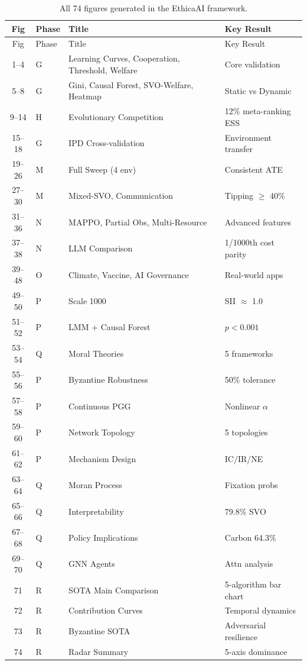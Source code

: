 \documentclass{article}
\begin{document}
\begin{longtable}{clll}
\caption{All 74 figures generated in the EthicaAI framework.} \\
\toprule
Fig & Phase & Title & Key Result \\
\midrule
\endfirsthead
\toprule
Fig & Phase & Title & Key Result \\
\midrule
\endhead
1--4 & G & Learning Curves, Cooperation, Threshold, Welfare & Core validation \\
5--8 & G & Gini, Causal Forest, SVO-Welfare, Heatmap & Static vs Dynamic \\
9--14 & H & Evolutionary Competition & 12\% meta-ranking ESS \\
15--18 & G & IPD Cross-validation & Environment transfer \\
19--26 & M & Full Sweep (4 env) & Consistent ATE \\
27--30 & M & Mixed-SVO, Communication & Tipping $\geq$ 40\% \\
31--36 & N & MAPPO, Partial Obs, Multi-Resource & Advanced features \\
37--38 & N & LLM Comparison & 1/1000th cost parity \\
39--48 & O & Climate, Vaccine, AI Governance & Real-world apps \\
49--50 & P & Scale 1000 & SII $\approx$ 1.0 \\
51--52 & P & LMM + Causal Forest & $p < 0.001$ \\
53--54 & Q & Moral Theories & 5 frameworks \\
55--56 & P & Byzantine Robustness & 50\% tolerance \\
57--58 & P & Continuous PGG & Nonlinear $\alpha$ \\
59--60 & P & Network Topology & 5 topologies \\
61--62 & P & Mechanism Design & IC/IR/NE \\
63--64 & Q & Moran Process & Fixation probs \\
65--66 & Q & Interpretability & 79.8\% SVO \\
67--68 & Q & Policy Implications & Carbon 64.3\% \\
69--70 & Q & GNN Agents & Attn analysis \\
71 & R & SOTA Main Comparison & 5-algorithm bar chart \\
72 & R & Contribution Curves & Temporal dynamics \\
73 & R & Byzantine SOTA & Adversarial resilience \\
74 & R & Radar Summary & 5-axis dominance \\
\bottomrule
\end{longtable}
\end{document}
